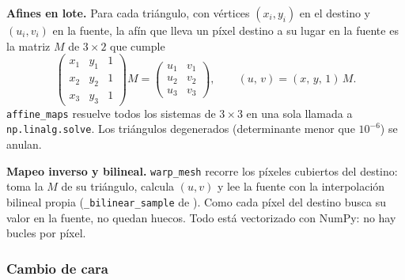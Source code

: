 \textbf{Afines en lote.} Para cada triángulo, con vértices $(x_i,y_i)$ en el destino y $(u_i,v_i)$ en la fuente, la afín que lleva un píxel destino a su lugar en la fuente es la matriz $M$ de $3\times2$ que cumple
\begin{equation}
  \begin{pmatrix} x_1 & y_1 & 1\\ x_2 & y_2 & 1\\ x_3 & y_3 & 1 \end{pmatrix} M =
  \begin{pmatrix} u_1 & v_1\\ u_2 & v_2\\ u_3 & v_3 \end{pmatrix},
  \qquad (u,\,v)=(x,\,y,\,1)\,M.
\end{equation}
\texttt{affine\_maps} resuelve todos los sistemas de $3\times3$ en una sola llamada a \texttt{np.linalg.solve}. Los triángulos degenerados (determinante menor que $10^{-6}$) se anulan.

\textbf{Mapeo inverso y bilineal.} \texttt{warp\_mesh} recorre los píxeles cubiertos del destino: toma la $M$ de su triángulo, calcula $(u,v)$ y lee la fuente con la interpolación bilineal propia (\texttt{\_bilinear\_sample} de ). Como cada píxel del destino busca su valor en la fuente, no quedan huecos. Todo está vectorizado con NumPy: no hay bucles por píxel.

\subsubsection{Cambio de cara}

